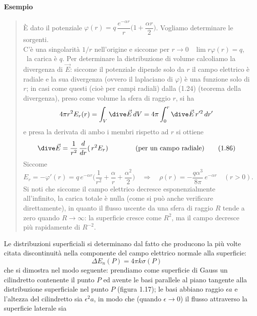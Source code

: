 \paragraph{Esempio}
\begin{quote}
  \`E dato il potenziale
  $\varphi(r)=q\,\dfrac{e^{-\alpha r}}{r}\Big(1+\dfrac{\alpha r}{2}\Big)$.
  Vogliamo determinare le sorgenti.\\
  C'\`e una singolarit\`a $1/r$ nell'origine e siccome per $r\to0$
  \ $\lim r\varphi(r)=q$, \ la carica \`e $q$. Per determinare la distribuzione
  di volume calcoliamo la divergenza di $\vec E$: siccome il potenziale dipende
  solo da $r$ il campo elettrico \`e radiale e la sua divergenza (ovvero il
  laplaciano di $\varphi$) \`e una funzione solo di $r$; in casi come questi
  (cio\`e per campi radiali) dalla (1.24) (teorema della divergenza), preso come
  volume la sfera di raggio $r$, si ha
  \[
    4\pi r^2E_r(r)=\int_V\dive\vec E\,dV=4\pi\int_0^r\dive\vec E\,r'^2\,dr'
  \]
  e presa la derivata di ambo i membri rispetto ad $r$ si ottiene
  \begin{equation}
    \dive\vec E=\frac{1}{r^2}\,\frac{d}{dr}(\,r^2E_r)
    \qquad\qquad\text{(per un campo radiale)}
    \tag{1.86}
  \end{equation}
  Siccome
  \[
    E_r=-\varphi'(r)=q\,e^{-\alpha r}\Big(\frac{1}{r^2}+\frac\alpha r
    +\frac{\alpha^2}{2}\Big)
    \quad\Rightarrow\quad\rho(r)=-\frac{q\alpha^3}{8\pi}\,e^{-\alpha r}
    \quad(r>0).
  \]
  Si noti che siccome il campo elettrico decresce esponenzialmente all'infinito,
  la carica totale \`e nulla (come si pu\`o anche verificare direttamente), in
  quanto il flusso uscente da una sfera di raggio $R$ tende a zero quando
  $R\to\infty$: la superficie cresce come $R^2$, ma il campo decresce pi\`u
  rapidamente di $R^{-2}$.
\end{quote}
Le distribuzioni superficiali si determinano dal fatto che producono la pi\`u
volte citata discontinuit\`a nella componente del campo elettrico normale alla
superficie:
\begin{equation}
  \Delta E_n(P)=4\pi k\sigma(P)
  \tag{1.87}
\end{equation}
che si dimostra nel modo seguente: prendiamo come superficie di Gauss un
cilindretto contenente il punto $P$ ed avente le basi parallele al piano
tangente alla distribuzione superficiale nel punto $P$ (figura 1.17); le basi
abbiano raggio $\epsilon a$ e l'altezza del cilindretto sia $\epsilon^2a$, in
modo che (quando $\epsilon\to0$) il flusso attraverso la superficie laterale sia
